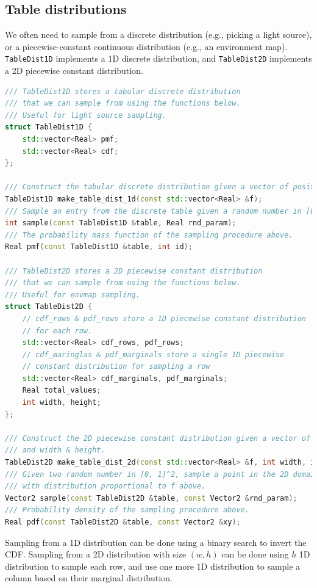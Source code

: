 \subsection{Table distributions}
We often need to sample from a discrete distribution (e.g., picking a light source), or a piecewise-constant continuous distribution (e.g., an environment map).
\lstinline{TableDist1D} implements a 1D discrete distribution, and \lstinline{TableDist2D} implements a 2D piecewise constant distribution.
\begin{lstlisting}[language=c++]
/// TableDist1D stores a tabular discrete distribution
/// that we can sample from using the functions below.
/// Useful for light source sampling.
struct TableDist1D {
    std::vector<Real> pmf;
    std::vector<Real> cdf;
};

/// Construct the tabular discrete distribution given a vector of positive numbers.
TableDist1D make_table_dist_1d(const std::vector<Real> &f);
/// Sample an entry from the discrete table given a random number in [0, 1]
int sample(const TableDist1D &table, Real rnd_param);
/// The probability mass function of the sampling procedure above.
Real pmf(const TableDist1D &table, int id);

/// TableDist2D stores a 2D piecewise constant distribution
/// that we can sample from using the functions below.
/// Useful for envmap sampling.
struct TableDist2D {
    // cdf_rows & pdf_rows store a 1D piecewise constant distribution
    // for each row.
    std::vector<Real> cdf_rows, pdf_rows;
    // cdf_maringlas & pdf_marginals store a single 1D piecewise
    // constant distribution for sampling a row
    std::vector<Real> cdf_marginals, pdf_marginals;
    Real total_values;
    int width, height;
};

/// Construct the 2D piecewise constant distribution given a vector of positive numbers
/// and width & height.
TableDist2D make_table_dist_2d(const std::vector<Real> &f, int width, int height);
/// Given two random number in [0, 1]^2, sample a point in the 2D domain [0, 1]^2
/// with distribution proportional to f above.
Vector2 sample(const TableDist2D &table, const Vector2 &rnd_param);
/// Probability density of the sampling procedure above.
Real pdf(const TableDist2D &table, const Vector2 &xy);
\end{lstlisting}

Sampling from a 1D distribution can be done using a binary search to invert the CDF. Sampling
from a 2D distribution with size $(w, h)$ can be done using $h$ 1D distribution to sample each row,
and use one more 1D distribution to sample a column based on their marginal distribution.


